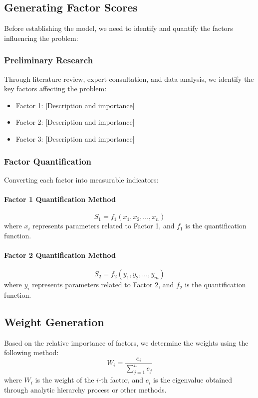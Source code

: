 \documentclass[12pt,a4paper]{article}
\begin{document}
\subsection{Generating Factor Scores}
Before establishing the model, we need to identify and quantify the factors influencing the problem:

\subsubsection{Preliminary Research}
Through literature review, expert consultation, and data analysis, we identify the key factors affecting the problem:
\begin{itemize}
  \item Factor 1: [Description and importance]
  \item Factor 2: [Description and importance]
  \item Factor 3: [Description and importance]
\end{itemize}

\subsubsection{Factor Quantification}
Converting each factor into measurable indicators:

\paragraph{Factor 1 Quantification Method}
\begin{equation}
S_1 = f_1(x_1, x_2, ..., x_n)
\end{equation}
where $x_i$ represents parameters related to Factor 1, and $f_1$ is the quantification function.

\paragraph{Factor 2 Quantification Method}
\begin{equation}
S_2 = f_2(y_1, y_2, ..., y_m)
\end{equation}
where $y_i$ represents parameters related to Factor 2, and $f_2$ is the quantification function.

\subsection{Weight Generation}
Based on the relative importance of factors, we determine the weights using the following method:
\begin{equation}
W_i = \frac{e_i}{\sum_{j=1}^n e_j}
\end{equation}
where $W_i$ is the weight of the $i$-th factor, and $e_i$ is the eigenvalue obtained through analytic hierarchy process or other methods.
\end{document}
